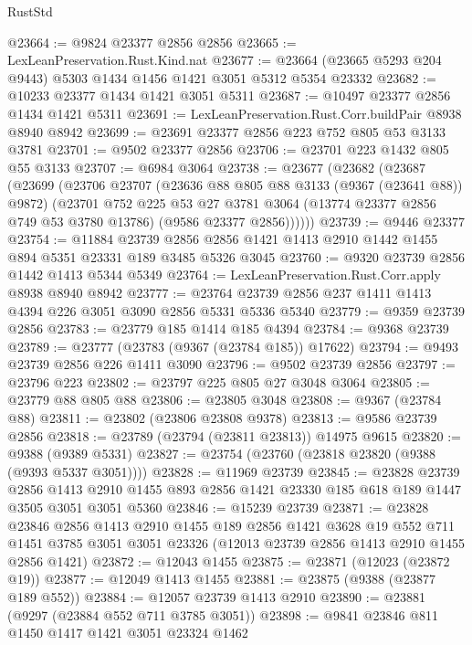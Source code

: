 \begin{lexlean}{RustStd}
\begin{coremodule}
@23664 := @9824 @23377 @2856 @2856
@23665 := LexLeanPreservation.Rust.Kind.nat
@23677 := @23664 (@23665 @5293 @204 @9443) @5303 @1434 @1456 @1421 @3051 @5312 @5354 @23332
@23682 := @10233 @23377 @1434 @1421 @3051 @5311
@23687 := @10497 @23377 @2856 @1434 @1421 @5311
@23691 := LexLeanPreservation.Rust.Corr.buildPair @8938 @8940 @8942
@23699 := @23691 @23377 @2856 @223 @752 @805 @53 @3133 @3781
@23701 := @9502 @23377 @2856
@23706 := @23701 @223 @1432 @805 @55 @3133
@23707 := @6984 @3064
@23738 := @23677
    (@23682
      (@23687
        (@23699
          (@23706
            @23707
            (@23636 @88 @805 @88 @3133 (@9367 (@23641 @88)) @9872)
            (@23701
              @752
              @225
              @53
              @27
              @3781
              @3064
              (@13774 @23377 @2856 @749 @53 @3780 @13786)
              (@9586 @23377 @2856))))))
@23739 := @9446 @23377
@23754 := @11884
    @23739
    @2856
    @2856
    @1421
    @1413
    @2910
    @1442
    @1455
    @894
    @5351
    @23331
    @189
    @3485
    @5326
    @3045
@23760 := @9320 @23739 @2856 @1442 @1413 @5344 @5349
@23764 := LexLeanPreservation.Rust.Corr.apply @8938 @8940 @8942
@23777 := @23764 @23739 @2856 @237 @1411 @1413 @4394 @226 @3051 @3090 @2856 @5331 @5336 @5340
@23779 := @9359 @23739 @2856
@23783 := @23779 @185 @1414 @185 @4394
@23784 := @9368 @23739
@23789 := @23777 (@23783 (@9367 (@23784 @185)) @17622)
@23794 := @9493 @23739 @2856 @226 @1411 @3090
@23796 := @9502 @23739 @2856
@23797 := @23796 @223
@23802 := @23797 @225 @805 @27 @3048 @3064
@23805 := @23779 @88 @805 @88
@23806 := @23805 @3048
@23808 := @9367 (@23784 @88)
@23811 := @23802 (@23806 @23808 @9378)
@23813 := @9586 @23739 @2856
@23818 := @23789 (@23794 (@23811 @23813)) @14975 @9615
@23820 := @9388 (@9389 @5331)
@23827 := @23754 (@23760 (@23818 @23820 (@9388 (@9393 @5337 @3051))))
@23828 := @11969 @23739
@23845 := @23828
    @23739
    @2856
    @1413
    @2910
    @1455
    @893
    @2856
    @1421
    @23330
    @185
    @618
    @189
    @1447
    @3505
    @3051
    @3051
    @5360
@23846 := @15239 @23739
@23871 := @23828
    @23846
    @2856
    @1413
    @2910
    @1455
    @189
    @2856
    @1421
    @3628
    @19
    @552
    @711
    @1451
    @3785
    @3051
    @3051
    @23326
    (@12013 @23739 @2856 @1413 @2910 @1455 @2856 @1421)
@23872 := @12043 @1455
@23875 := @23871 (@12023 (@23872 @19))
@23877 := @12049 @1413 @1455
@23881 := @23875 (@9388 (@23877 @189 @552))
@23884 := @12057 @23739 @1413 @2910
@23890 := @23881 (@9297 (@23884 @552 @711 @3785 @3051))
@23898 := @9841 @23846 @811 @1450 @1417 @1421 @3051 @23324 @1462

\end{coremodule}
\end{lexlean}
